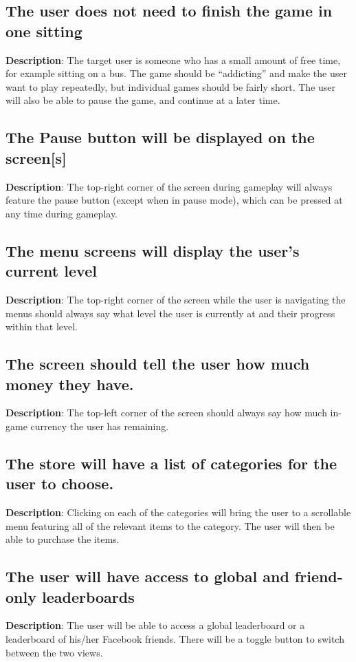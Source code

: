 \subsection{The user does not need to finish the game in one sitting}
\textbf{Description}: The target user is someone who has a small amount of
free time, for example sitting on a bus. The game should be \textquotedblleft{}addicting\textquotedblright{}
and make the user want to play repeatedly, but individual games should
be fairly short. The user will also be able to pause the game, and
continue at a later time.

\subsection{The Pause button will be displayed on the screen{[}s{]}}
\textbf{Description}: The top-right corner of the screen during gameplay will
always feature the pause button (except when in pause mode), which
can be pressed at any time during gameplay.

\subsection{The menu screens will display the user\textquoteright{}s
current level}
\textbf{Description}: The top-right corner of the screen while the user is
navigating the menus should always say what level the user is currently
at and their progress within that level.

\subsection{The screen should tell the user how much money they have.}
\textbf{Description}: The top-left corner of the screen should always say how
much in-game currency the user has remaining.

\subsection{The store will have a list of categories for the user to
choose. }
\textbf{Description}: Clicking on each of the categories will bring the user
to a scrollable menu featuring all of the relevant items to the category.
The user will then be able to purchase the items. 

\subsection{The user will have access to global and friend-only leaderboards}
\textbf{Description}: The user will be able to access a global leaderboard
or a leaderboard of his/her Facebook friends. There will be a toggle
button to switch between the two views.


